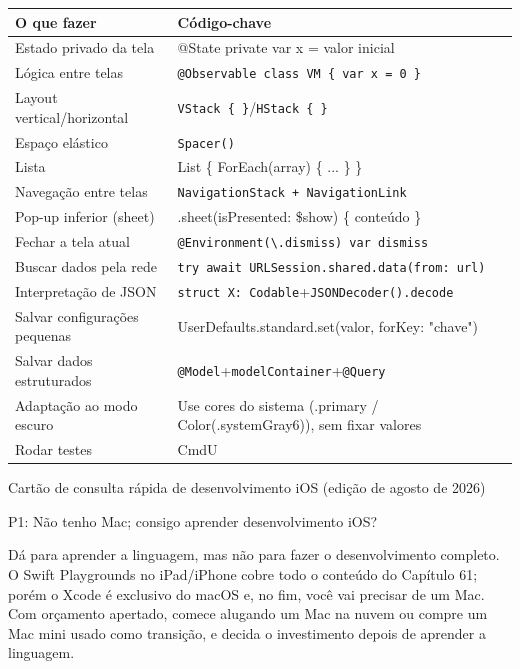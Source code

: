 


\begin{center}
\begin{tabularx}{\linewidth}{|X|X|}
\hline
\textbf{O que fazer} & \textbf{Código-chave} \tabularnewline
\hline
Estado privado da tela & @State private var x = valor inicial \tabularnewline
Lógica entre telas & \texttt{@Observable class VM \{ var x = 0 \}} \tabularnewline
Layout vertical/horizontal & \texttt{VStack \{ \}}/\texttt{HStack \{ \}} \tabularnewline
Espaço elástico & \texttt{Spacer()} \tabularnewline
Lista & List \{ ForEach(array) \{ ... \} \} \tabularnewline
Navegação entre telas & \texttt{NavigationStack + NavigationLink} \tabularnewline
Pop-up inferior (sheet) & .sheet(isPresented: \$show) \{ conteúdo \} \tabularnewline
Fechar a tela atual & \texttt{@Environment(\textbackslash{}.\allowbreak dismiss) var dismiss} \tabularnewline
Buscar dados pela rede & \texttt{try await URLSession.\allowbreak shared.\allowbreak data(from: url)} \tabularnewline
Interpretação de JSON & \texttt{struct X: Codable}+\texttt{JSONDecoder().\allowbreak decode} \tabularnewline
Salvar configurações pequenas & UserDefaults.standard.set(valor, forKey: "chave") \tabularnewline
Salvar dados estruturados & \texttt{@Model}+\texttt{modelContainer}+\texttt{@Query} \tabularnewline
Adaptação ao modo escuro & Use cores do sistema (.primary / Color(.systemGray6)), sem fixar valores \tabularnewline
Rodar testes & CmdU \tabularnewline
\hline
\end{tabularx}
\end{center}

\begin{center}\small\color{gray}Cartão de consulta rápida de desenvolvimento iOS (edição de agosto de 2026)\end{center}


P1: Não tenho Mac; consigo aprender desenvolvimento iOS?

Dá para aprender a linguagem, mas não para fazer o desenvolvimento completo. O Swift Playgrounds no iPad/iPhone cobre todo o conteúdo do Capítulo 61; porém o Xcode é exclusivo do macOS e, no fim, você vai precisar de um Mac. Com orçamento apertado, comece alugando um Mac na nuvem ou compre um Mac mini usado como transição, e decida o investimento depois de aprender a linguagem.

